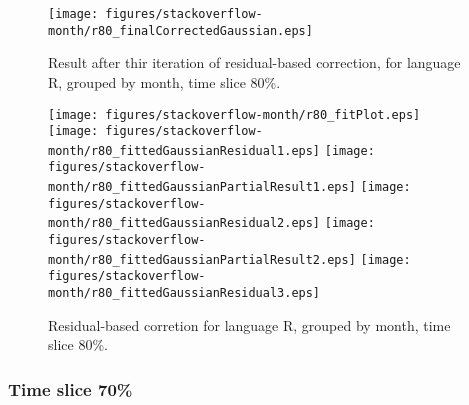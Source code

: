 \begin{figure}[]
\centering
{\texttt{[image: figures/stackoverflow-month/r80\_finalCorrectedGaussian.eps]}}
\caption{Result after thir iteration of residual-based correction, for language R, grouped by month, time slice 80\%.}
\end{figure}


\begin{figure}[hb]
\centering
{}
{\texttt{[image: figures/stackoverflow-month/r80\_fitPlot.eps]}}
{\texttt{[image: figures/stackoverflow-month/r80\_fittedGaussianResidual1.eps]}}
{\texttt{[image: figures/stackoverflow-month/r80\_fittedGaussianPartialResult1.eps]}}
{\texttt{[image: figures/stackoverflow-month/r80\_fittedGaussianResidual2.eps]}}
{\texttt{[image: figures/stackoverflow-month/r80\_fittedGaussianPartialResult2.eps]}}
{\texttt{[image: figures/stackoverflow-month/r80\_fittedGaussianResidual3.eps]}}
\caption{Residual-based corretion for language R, grouped by month, time slice 80\%.}
\end{figure}


\clearpage 
\newpage 


\FloatBarrier

\subsubsection{Time slice 70\%}


